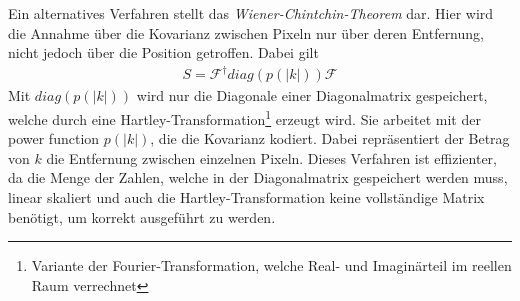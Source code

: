 Ein alternatives Verfahren stellt das \emph{Wiener-Chintchin-Theorem} dar. Hier wird die Annahme über die Kovarianz zwischen Pixeln nur über deren Entfernung, nicht jedoch über die Position getroffen. Dabei gilt
\begin{eqnarray}
S= \mathcal{F}^{\dagger} diag(p(|k|)) \mathcal{F}
\end{eqnarray}
Mit $diag(p(|k|))$ wird nur die Diagonale einer Diagonalmatrix gespeichert, welche durch eine Hartley-Transformation\footnote{Variante der Fourier-Transformation, welche Real- und Imaginärteil im reellen Raum verrechnet} erzeugt wird. Sie arbeitet mit der power function $p(|k|)$, die die Kovarianz kodiert. Dabei repräsentiert der Betrag von $k$ die Entfernung zwischen einzelnen Pixeln. Dieses Verfahren ist effizienter, da die Menge der Zahlen, welche in der Diagonalmatrix gespeichert werden muss, linear skaliert und auch die Hartley-Transformation keine vollständige Matrix benötigt, um korrekt ausgeführt zu werden.

